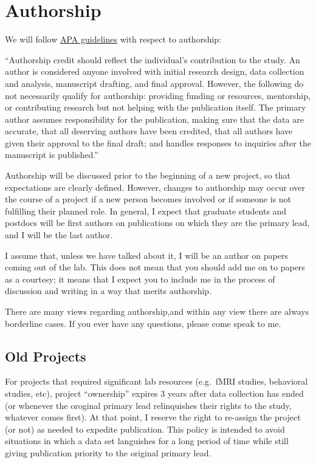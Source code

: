\documentclass[
]{book}
\begin{document}
\hypertarget{authorship}{%
\section{Authorship}\label{authorship}}

We will follow \href{https://www.apa.org/research/responsible/publication/}{APA guidelines} with respect to authorship:

``Authorship credit should reflect the individual's contribution to the study. An author is considered anyone involved with initial research design, data collection and analysis, manuscript drafting, and final approval. However, the following do not necessarily qualify for authorship: providing funding or resources, mentorship, or contributing research but not helping with the publication itself. The primary author assumes responsibility for the publication, making sure that the data are accurate, that all deserving authors have been credited, that all authors have given their approval to the final draft; and handles responses to inquiries after the manuscript is published.''

Authorship will be discussed prior to the beginning of a new project, so that expectations are clearly defined. However, changes to authorship may occur over the course of a project if a new person becomes involved or if someone is not fulfilling their planned role. In general, I expect that graduate students and postdocs will be first authors on publications on which they are the primary lead, and I will be the last author.

I assume that, unless we have talked about it, I will be an author on papers coming out of the lab. This does not mean that you should add me on to
papers as a courtesy; it means that I expect you to include me in the process
of discussion and writing in a way that merits authorship.

There are many views regarding authorship,and within any view there are always borderline cases. If you ever have any questions, please come speak to me.

\hypertarget{old-projects}{%
\subsection{Old Projects}\label{old-projects}}

For projects that required significant lab resources (e.g.~fMRI studies, behavioral studies, etc), project ``ownership'' expires 3 years after data collection has ended (or whenever the oroginal primary lead relinquishes their rights to the study, whatever comes first). At that point, I reserve the right to re-assign the project (or not) as needed to expedite publication. This policy is intended to avoid situations in which a data set languishes for a long period of time while still giving publication priority to the original primary lead.
\end{document}
